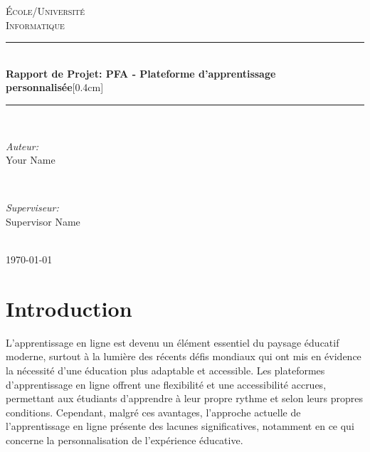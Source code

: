 





\pagestyle{fancy}
\fancyhf{}

\begin{titlepage}
\newcommand{\HRule}{\rule{\linewidth}{0.5mm}}
\centering
\vfill
\textsc{\LARGE École/Université}\\[0.5cm]  
\textsc{\Large Informatique}\\[0.5cm]  %
\HRule \\[0.4cm]
{ \huge \bfseries Rapport de Projet: PFA - Plateforme d'apprentissage personnalisée}[0.4cm] 
\HRule \\[1.5cm]

\begin{minipage}{0.4\textwidth}
\begin{flushleft} \large
\emph{Auteur:}\\
Your Name
\end{flushleft}
\end{minipage}
~
\begin{minipage}{0.4\textwidth}
\begin{flushright} \large
\emph{Superviseur:} \\
Supervisor Name
\end{flushright}
\end{minipage}\\[2cm]

{\large \today}\\[2cm] 
\nopagebreak
\end{titlepage}

\tableofcontents
\newpage


\section{Introduction}

L'apprentissage en ligne est devenu un élément essentiel du paysage éducatif moderne, surtout à la lumière des récents défis mondiaux qui ont mis en évidence la nécessité d'une éducation plus adaptable et accessible. Les plateformes d'apprentissage en ligne offrent une flexibilité et une accessibilité accrues, permettant aux étudiants d'apprendre à leur propre rythme et selon leurs propres conditions. Cependant, malgré ces avantages, l'approche actuelle de l'apprentissage en ligne présente des lacunes significatives, notamment en ce qui concerne la personnalisation de l'expérience éducative.

